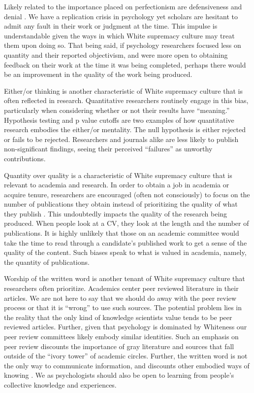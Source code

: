 \documentclass[
  11pt,
]{book}
\begin{document}
Likely related to the importance placed on perfectionism are defensiveness and denial \citep{okun_white_2021}. We have a replication crisis in psychology \citep{diener_replication_2016} yet scholars are hesitant to admit any fault in their work or judgment at the time. This impulse is understandable given the ways in which White supremacy culture may treat them upon doing so. That being said, if psychology researchers focused less on quantity and their reported objectivism, and were more open to obtaining feedback on their work at the time it was being completed, perhaps there would be an improvement in the quality of the work being produced.

Either/or thinking is another characteristic of White supremacy culture \citep{okun_white_2021} that is often reflected in research. Quantitative researchers routinely engage in this bias, particularly when considering whether or not their results have ``meaning.'' Hypothesis testing and p value cutoffs are two examples of how quantitative research embodies the either/or mentality. The null hypothesis is either rejected or fails to be rejected. Researchers and journals alike are less likely to publish non-significant findings, seeing their perceived ``failures'' as unworthy contributions.

Quantity over quality is a characteristic of White supremacy culture \citep{okun_white_2021} that is relevant to academia and research. In order to obtain a job in academia or acquire tenure, researchers are encouraged (often not consciously) to focus on the number of publications they obtain instead of prioritizing the quality of what they publish \citep{blaszczynski_editors_2019}. This undoubtedly impacts the quality of the research being produced. When people look at a CV, they look at the length and the number of publications. It is highly unlikely that those on an academic committee would take the time to read through a candidate's published work to get a sense of the quality of the content. Such biases speak to what is valued in academia, namely, the quantity of publications.

Worship of the written word \citep{okun_white_2021} is another tenant of White supremacy culture that researchers often prioritize. Academics center peer reviewed literature in their articles. We are not here to say that we should do away with the peer review process or that it is ``wrong'' to use such sources. The potential problem lies in the reality that the only kind of knowledge scientists value tends to be peer reviewed articles. Further, given that psychology is dominated by Whiteness \citep{dupree_psychological_2022} our peer review committees likely embody similar identities. Such an emphasis on peer review discounts the importance of gray literature and sources that fall outside of the ``ivory tower'' of academic circles. Further, the written word is not the only way to communicate information, and discounts other embodied ways of knowing \citep{hargons_black_2017}. We as psychologists should also be open to learning from people's collective knowledge and experiences.
\end{document}
